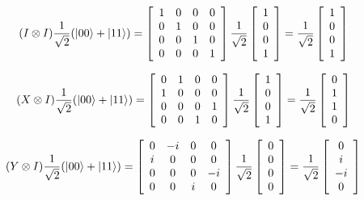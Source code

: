 \documentclass[12pt]{article}
\begin{document}
\begin{enumerate}
\begin{displaymath}
(I \otimes I) \frac{1}{\sqrt{2}} (|00 \rangle + |11 \rangle) =
\left[ \begin{array}{cccc}
1 & 0 & 0 & 0 \\
0 & 1 & 0 & 0 \\
0 & 0 & 1 & 0 \\
0 & 0 & 0 & 1
\end{array} \right]
\frac{1}{\sqrt{2}}
\left[ \begin{array}{c}
1\\
0\\
0\\
1
\end{array} \right] =
\frac{1}{\sqrt{2}}
\left[ \begin{array}{c}
1\\
0\\
0\\
1
\end{array} \right]
\end{displaymath}

\begin{displaymath}
(X \otimes I) \frac{1}{\sqrt{2}}(|00 \rangle + |11 \rangle) =
\left[ \begin{array}{cccc}
0 & 1 & 0 & 0 \\
1 & 0 & 0 & 0 \\
0 & 0 & 0 & 1 \\
0 & 0 & 1 & 0
\end{array} \right]
\frac{1}{\sqrt{2}}
\left[ \begin{array}{c}
1\\
0\\
0\\
1
\end{array} \right] =
\frac{1}{\sqrt{2}}
\left[ \begin{array}{c}
0\\
1\\
1\\
0
\end{array} \right]
\end{displaymath}

\begin{displaymath}
(Y \otimes I) \frac{1}{\sqrt{2}}(|00 \rangle + |11 \rangle) =
\left[ \begin{array}{cccc}
0 & -i & 0 & 0 \\
i & 0 & 0 & 0 \\
0 & 0 & 0 & -i \\
0 & 0 & i & 0
\end{array} \right]
\frac{1}{\sqrt{2}}
\left[ \begin{array}{c}
0\\
0\\
0\\
0
\end{array} \right] =
\frac{1}{\sqrt{2}}
\left[ \begin{array}{c}
0\\
i\\
-i\\
0
\end{array} \right]
\end{displaymath}


\end{enumerate}
\end{document}
